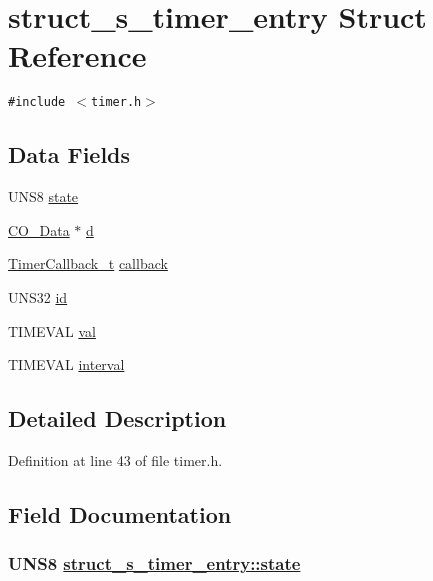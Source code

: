 \hypertarget{structstruct__s__timer__entry}{
\section{struct\_\-s\_\-timer\_\-entry Struct Reference}
\label{structstruct__s__timer__entry}
}
{\tt \#include $<$timer.h$>$}

\subsection*{Data Fields}
\begin{CompactItemize}
\item 
UNS8 \hyperlink{structstruct__s__timer__entry_a58939661154282941a8b289d6019064}{state}
\item 
\hyperlink{structstruct__CO__Data}{CO\_\-Data} $\ast$ \hyperlink{structstruct__s__timer__entry_c08f4de0f4a517ce2bb72f18251cd13c}{d}
\item 
\hyperlink{timer_8h_f7d102e060339d3730ceae5fea03691b}{Timer\-Callback\_\-t} \hyperlink{structstruct__s__timer__entry_3aaad06b3f938b7af91b790a4dd30669}{callback}
\item 
UNS32 \hyperlink{structstruct__s__timer__entry_aaaa1955d3358bf87060856bdf834b61}{id}
\item 
TIMEVAL \hyperlink{structstruct__s__timer__entry_ab57b1903f3819bce5018173dfb9f999}{val}
\item 
TIMEVAL \hyperlink{structstruct__s__timer__entry_472c7adbaa1bd11813ab888ae328c61c}{interval}
\end{CompactItemize}


\subsection{Detailed Description}




Definition at line 43 of file timer.h.

\subsection{Field Documentation}
\hypertarget{structstruct__s__timer__entry_a58939661154282941a8b289d6019064}{
\subsubsection[state]{\setlength{\rightskip}{0pt plus 5cm}UNS8 \hyperlink{structstruct__s__timer__entry_a58939661154282941a8b289d6019064}{struct\_\-s\_\-timer\_\-entry::state}}}
\label{structstruct__s__timer__entry_a58939661154282941a8b289d6019064}




